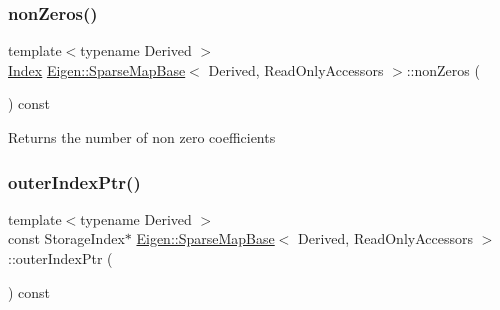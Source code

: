 \subsubsection{\texorpdfstring{nonZeros()}{nonZeros()}}
{\footnotesize\ttfamily template$<$typename Derived $>$ \\
\mbox{\hyperlink{struct_eigen_1_1_eigen_base_a554f30542cc2316add4b1ea0a492ff02}{Index}} \mbox{\hyperlink{class_eigen_1_1_sparse_map_base}{Eigen\+::\+Sparse\+Map\+Base}}$<$ Derived, Read\+Only\+Accessors $>$\+::non\+Zeros (\begin{DoxyParamCaption}{ }\end{DoxyParamCaption}) const\hspace{0.3cm}{\ttfamily [inline]}}





\begin{DoxyReturn}{Returns}
the number of non zero coefficients 
\end{DoxyReturn}
\mbox{\label{class_eigen_1_1_sparse_map_base_3_01_derived_00_01_read_only_accessors_01_4_a24c55dd8de4aca30e7c90b69aa5dca6b}} 
\subsubsection{\texorpdfstring{outerIndexPtr()}{outerIndexPtr()}}
{\footnotesize\ttfamily template$<$typename Derived $>$ \\
const Storage\+Index$\ast$ \mbox{\hyperlink{class_eigen_1_1_sparse_map_base}{Eigen\+::\+Sparse\+Map\+Base}}$<$ Derived, Read\+Only\+Accessors $>$\+::outer\+Index\+Ptr (\begin{DoxyParamCaption}{ }\end{DoxyParamCaption}) const\hspace{0.3cm}{\ttfamily [inline]}}





